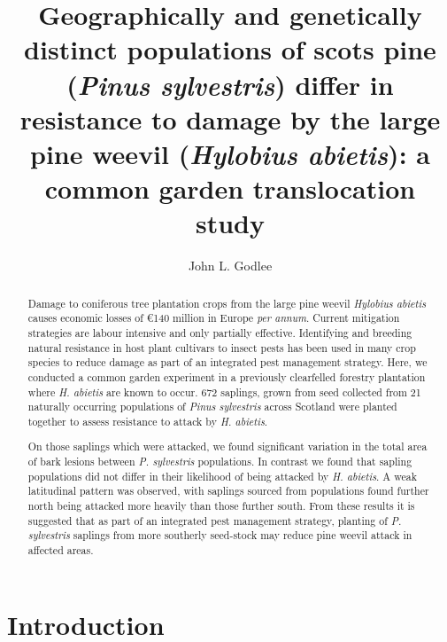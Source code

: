 \documentclass[a4paper, 11pt]{article}
\title{Geographically and genetically distinct populations of scots pine (\textit{Pinus sylvestris}) differ in resistance to damage by the large pine weevil (\textit{Hylobius abietis}): a common garden translocation study}
\author{John L. Godlee}
\begin{document}

\maketitle{}

\begin{abstract}

	Damage to coniferous tree plantation crops from the large pine weevil \textit{Hylobius abietis} causes economic losses of \euro{}140 million in Europe \textit{per annum}. Current mitigation strategies are labour intensive and only partially effective. Identifying and breeding natural resistance in host plant cultivars to insect pests has been used in many crop species to reduce damage as part of an integrated pest management strategy. Here, we conducted a common garden experiment in a previously clearfelled forestry plantation where \textit{H. abietis} are known to occur. 672 saplings, grown from seed collected from 21 naturally occurring populations of \textit{Pinus sylvestris} across Scotland were planted together to assess resistance to attack by \textit{H. abietis}.

	On those saplings which were attacked, we found significant variation in the total area of bark lesions between \textit{P. sylvestris} populations. In contrast we found that sapling populations did not differ in their likelihood of being attacked by \textit{H. abietis}. A weak latitudinal pattern was observed, with saplings sourced from populations found further north being attacked more heavily than those further south. From these results it is suggested that as part of an integrated pest management strategy, planting of \textit{P. sylvestris} saplings from more southerly seed-stock may reduce pine weevil attack in affected areas.



\end{abstract}

\section*{Introduction}
\end{document}
